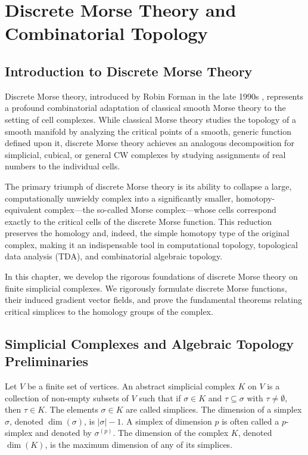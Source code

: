 \chapter{Discrete Morse Theory and Combinatorial Topology}
\label{ch:discrete_morse_theory}

\section{Introduction to Discrete Morse Theory}
Discrete Morse theory, introduced by Robin Forman in the late 1990s \cite{forman1998morse}, represents a profound combinatorial adaptation of classical smooth Morse theory to the setting of cell complexes. While classical Morse theory studies the topology of a smooth manifold by analyzing the critical points of a smooth, generic function defined upon it, discrete Morse theory achieves an analogous decomposition for simplicial, cubical, or general CW complexes by studying assignments of real numbers to the individual cells.

The primary triumph of discrete Morse theory is its ability to collapse a large, computationally unwieldy complex into a significantly smaller, homotopy-equivalent complex---the so-called Morse complex---whose cells correspond exactly to the critical cells of the discrete Morse function. This reduction preserves the homology and, indeed, the simple homotopy type of the original complex, making it an indispensable tool in computational topology, topological data analysis (TDA), and combinatorial algebraic topology.

In this chapter, we develop the rigorous foundations of discrete Morse theory on finite simplicial complexes. We rigorously formulate discrete Morse functions, their induced gradient vector fields, and prove the fundamental theorems relating critical simplices to the homology groups of the complex.

\section{Simplicial Complexes and Algebraic Topology Preliminaries}

Let $V$ be a finite set of vertices. An abstract simplicial complex $K$ on $V$ is a collection of non-empty subsets of $V$ such that if $\sigma \in K$ and $\tau \subseteq \sigma$ with $\tau \neq \emptyset$, then $\tau \in K$. 
The elements $\sigma \in K$ are called simplices. The dimension of a simplex $\sigma$, denoted $\dim(\sigma)$, is $|\sigma| - 1$. A simplex of dimension $p$ is often called a $p$-simplex and denoted by $\sigma^{(p)}$. 
The dimension of the complex $K$, denoted $\dim(K)$, is the maximum dimension of any of its simplices.

